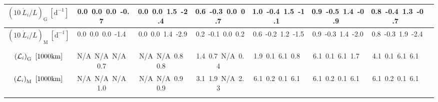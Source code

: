 \begin{table}[H]
{\begin{centering}
\begin{tabular}{|c|c|c|c|c|c|c|c|}
\hline
$\left(10\ \dot{L}_{i}/L\right)_{\mathrm{G}}\ \left[\mathrm{d^{-1}}\right]$ & \textcolor{C1}{0.0}\ \textcolor{C2}{0.0}\ \textcolor{C3}{0.0}\ \textcolor{C4}{-0.7}\  & \textcolor{C1}{0.0}\ \textcolor{C2}{0.0}\ \textcolor{C3}{1.5}\ \textcolor{C4}{-2.4}\  & \textcolor{C1}{0.6}\ \textcolor{C2}{-0.3}\ \textcolor{C3}{0.0}\ \textcolor{C4}{0.7}\  & \textcolor{C1}{1.0}\ \textcolor{C2}{-0.4}\ \textcolor{C3}{1.5}\ \textcolor{C4}{-1.1}\  & \textcolor{C1}{0.9}\ \textcolor{C2}{-0.5}\ \textcolor{C3}{1.4}\ \textcolor{C4}{-0.9}\  & \textcolor{C1}{0.8}\ \textcolor{C2}{-0.4}\ \textcolor{C3}{1.3}\ \textcolor{C4}{-0.7}\  \tabularnewline
\hline
$\left(10\ \dot{L}_{i}/L\right)_{\mathrm{M}}\ \left[\mathrm{d^{-1}}\right]$ & \textcolor{C1}{0.0}\ \textcolor{C2}{0.0}\ \textcolor{C3}{0.0}\ \textcolor{C4}{-1.4}\  & \textcolor{C1}{0.0}\ \textcolor{C2}{0.0}\ \textcolor{C3}{1.4}\ \textcolor{C4}{-2.9}\  & \textcolor{C1}{0.2}\ \textcolor{C2}{-0.1}\ \textcolor{C3}{0.0}\ \textcolor{C4}{0.2}\  & \textcolor{C1}{0.6}\ \textcolor{C2}{-0.2}\ \textcolor{C3}{1.2}\ \textcolor{C4}{-1.5}\  & \textcolor{C1}{0.9}\ \textcolor{C2}{-0.3}\ \textcolor{C3}{1.4}\ \textcolor{C4}{-2.0}\  & \textcolor{C1}{0.8}\ \textcolor{C2}{-0.3}\ \textcolor{C3}{1.9}\ \textcolor{C4}{-2.4}\  \tabularnewline
\hline
$\left({\cal L}_{i}\right)_{\mathrm{G}}\ \left[1000\mathrm{km}\right]$ & \textcolor{C1}{N/A}\ \textcolor{C2}{N/A}\ \textcolor{C3}{N/A}\ \textcolor{C4}{0.7}\  & \textcolor{C1}{N/A}\ \textcolor{C2}{N/A}\ \textcolor{C3}{0.8}\ \textcolor{C4}{0.8}\  & \textcolor{C1}{1.4}\ \textcolor{C2}{0.7}\ \textcolor{C3}{N/A}\ \textcolor{C4}{0.4}\  & \textcolor{C1}{1.9}\ \textcolor{C2}{0.1}\ \textcolor{C3}{6.1}\ \textcolor{C4}{0.8}\  & \textcolor{C1}{6.1}\ \textcolor{C2}{0.1}\ \textcolor{C3}{6.1}\ \textcolor{C4}{1.7}\  & \textcolor{C1}{4.1}\ \textcolor{C2}{0.1}\ \textcolor{C3}{6.1}\ \textcolor{C4}{6.1}\  \tabularnewline
\hline
$\left({\cal L}_{i}\right)_{\mathrm{M}}\ \left[1000\mathrm{km}\right]$ & \textcolor{C1}{N/A}\ \textcolor{C2}{N/A}\ \textcolor{C3}{N/A}\ \textcolor{C4}{1.0}\  & \textcolor{C1}{N/A}\ \textcolor{C2}{N/A}\ \textcolor{C3}{0.9}\ \textcolor{C4}{0.9}\  & \textcolor{C1}{3.1}\ \textcolor{C2}{1.9}\ \textcolor{C3}{N/A}\ \textcolor{C4}{2.3}\  & \textcolor{C1}{6.1}\ \textcolor{C2}{0.2}\ \textcolor{C3}{0.1}\ \textcolor{C4}{6.1}\  & \textcolor{C1}{6.1}\ \textcolor{C2}{0.2}\ \textcolor{C3}{0.1}\ \textcolor{C4}{6.1}\  & \textcolor{C1}{6.1}\ \textcolor{C2}{0.2}\ \textcolor{C3}{0.1}\ \textcolor{C4}{6.1}\  \tabularnewline
\hline
 &  &  &  &  &  & \tabularnewline
\hline
\end{tabular}
\par\end{centering} }
\end{table}
